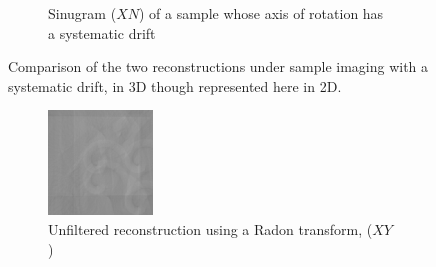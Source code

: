 \begin{figure}
\begin{subfigure}[t]{0.3\textwidth}
    \caption{Sinugram ($XN$) of a sample whose axis of rotation has a systematic drift}
    \label{fig:flopt_helix_sinugram}
  \end{subfigure}
    \hfill
    \label{fig:flopts}
  \caption{Comparison of the two reconstructions under sample imaging with a systematic drift, in 3D though represented here in 2D.}
\end{figure}
\begin{figure}
  \centering
  \hfill
  \begin{subfigure}[t]{0.3\textwidth}
    \includegraphics[width=\textwidth]{Chapters/flopt/Figs/PDF/results/helix/unfilttered_reconstruction_helix_iradon}
    \caption{Unfiltered reconstruction using a \gls{Radon transform}, (\(XY\))}
    \label{fig:unfilttered_reconstruction_helix_iradon}
  \end{subfigure}\hfill
  \begin{subfigure}[t]{0.3\textwidth}

\end{subfigure}
\end{figure}
